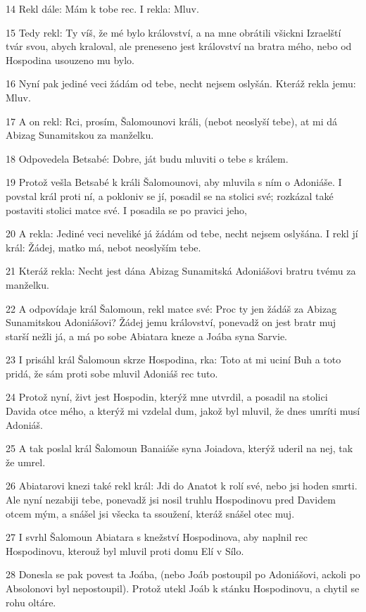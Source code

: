 \par 14 Rekl dále: Mám k tobe rec. I rekla: Mluv.
\par 15 Tedy rekl: Ty víš, že mé bylo království, a na mne obrátili všickni Izraelští tvár svou, abych kraloval, ale preneseno jest království na bratra mého, nebo od Hospodina usouzeno mu bylo.
\par 16 Nyní pak jediné veci žádám od tebe, necht nejsem oslyšán. Kteráž rekla jemu: Mluv.
\par 17 A on rekl: Rci, prosím, Šalomounovi králi, (nebot neoslyší tebe), at mi dá Abizag Sunamitskou za manželku.
\par 18 Odpovedela Betsabé: Dobre, ját budu mluviti o tebe s králem.
\par 19 Protož vešla Betsabé k králi Šalomounovi, aby mluvila s ním o Adoniáše. I povstal král proti ní, a pokloniv se jí, posadil se na stolici své; rozkázal také postaviti stolici matce své. I posadila se po pravici jeho,
\par 20 A rekla: Jediné veci neveliké já žádám od tebe, necht nejsem oslyšána. I rekl jí král: Žádej, matko má, nebot neoslyším tebe.
\par 21 Kteráž rekla: Necht jest dána Abizag Sunamitská Adoniášovi bratru tvému za manželku.
\par 22 A odpovídaje král Šalomoun, rekl matce své: Proc ty jen žádáš za Abizag Sunamitskou Adoniášovi? Žádej jemu království, ponevadž on jest bratr muj starší nežli já, a má po sobe Abiatara kneze a Joába syna Sarvie.
\par 23 I prisáhl král Šalomoun skrze Hospodina, rka: Toto at mi uciní Buh a toto pridá, že sám proti sobe mluvil Adoniáš rec tuto.
\par 24 Protož nyní, živt jest Hospodin, kterýž mne utvrdil, a posadil na stolici Davida otce mého, a kterýž mi vzdelal dum, jakož byl mluvil, že dnes umríti musí Adoniáš.
\par 25 A tak poslal král Šalomoun Banaiáše syna Joiadova, kterýž uderil na nej, tak že umrel.
\par 26 Abiatarovi knezi také rekl král: Jdi do Anatot k rolí své, nebo jsi hoden smrti. Ale nyní nezabiji tebe, ponevadž jsi nosil truhlu Hospodinovu pred Davidem otcem mým, a snášel jsi všecka ta ssoužení, kteráž snášel otec muj.
\par 27 I svrhl Šalomoun Abiatara s knežství Hospodinova, aby naplnil rec Hospodinovu, kterouž byl mluvil proti domu Elí v Sílo.
\par 28 Donesla se pak povest ta Joába, (nebo Joáb postoupil po Adoniášovi, ackoli po Absolonovi byl nepostoupil). Protož utekl Joáb k stánku Hospodinovu, a chytil se rohu oltáre.
